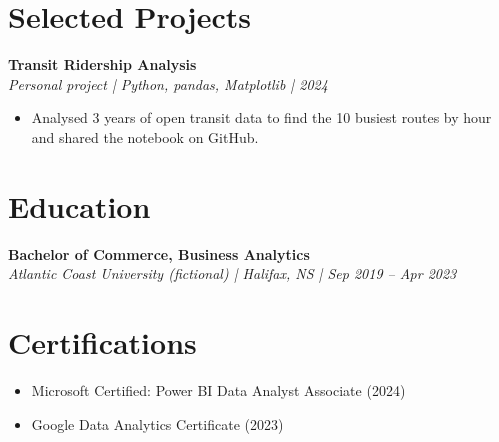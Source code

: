 \documentclass[11pt,letterpaper]{article}
\newcommand{\entry}[2]{\textbf{#1}\\\textit{#2}\par}
\begin{document}
\section{Selected Projects}
\entry{Transit Ridership Analysis}{Personal project | Python, pandas, Matplotlib | 2024}
\begin{itemize}
  \item Analysed 3 years of open transit data to find the 10 busiest routes by hour and shared the notebook on GitHub.
\end{itemize}

\section{Education}
\entry{Bachelor of Commerce, Business Analytics}{Atlantic Coast University (fictional) | Halifax, NS | Sep 2019 -- Apr 2023}

\section{Certifications}
\begin{itemize}
  \item Microsoft Certified: Power BI Data Analyst Associate (2024)
  \item Google Data Analytics Certificate (2023)
\end{itemize}
\end{document}
